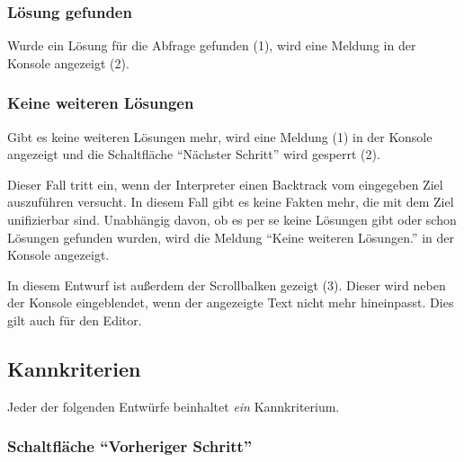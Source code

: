 \documentclass[parskip=full,11pt,twoside]{scrartcl}
\begin{document}
\subsubsection{Lösung gefunden}

\begin{minipage}{\linewidth}
\end{minipage}

Wurde ein Lösung für die Abfrage gefunden (1), wird eine Meldung in der Konsole angezeigt (2).

\subsubsection{Keine weiteren Lösungen}

\begin{minipage}{\linewidth}
\end{minipage}

Gibt es keine weiteren Lösungen mehr, wird eine Meldung (1) in der Konsole angezeigt und die Schaltfläche \enquote{Nächster Schritt} wird gesperrt (2).

Dieser Fall tritt ein, wenn der Interpreter einen Backtrack vom eingegeben Ziel auszuführen versucht.
In diesem Fall gibt es keine Fakten mehr, die mit dem Ziel unifizierbar sind.
Unabhängig davon, ob es per se keine Lösungen gibt oder schon Lösungen gefunden wurden, wird die Meldung \enquote{Keine weiteren Lösungen.} in der Konsole angezeigt.

In diesem Entwurf ist außerdem der Scrollbalken gezeigt (3).
Dieser wird neben der Konsole eingeblendet, wenn der angezeigte Text nicht mehr hineinpasst.
Dies gilt auch für den Editor.

\subsection{Kannkriterien}

Jeder der folgenden Entwürfe beinhaltet \emph{ein} Kannkriterium.

\subsubsection{Schaltfläche \enquote{Vorheriger Schritt}}
\end{document}
